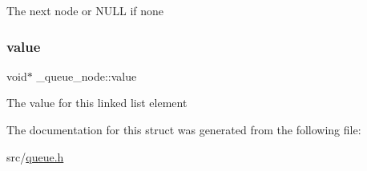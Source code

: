 The next node or N\+U\+LL if none \mbox{\label{struct__queue__node_a318b8c0ae9d8062ddebbc8f6a46fdd97}} 
\subsubsection{\texorpdfstring{value}{value}}
{\footnotesize\ttfamily void$\ast$ \+\_\+queue\+\_\+node\+::value}

The value for this linked list element 

The documentation for this struct was generated from the following file\+:\begin{DoxyCompactItemize}
\item 
src/\hyperlink{queue_8h}{queue.\+h}\end{DoxyCompactItemize}
